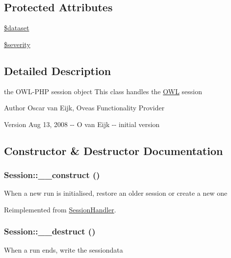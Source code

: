 \subsection*{Protected Attributes}
\begin{DoxyCompactItemize}
\item 
\hyperlink{classSessionHandler_a74c46fcfbadd4c4e6bacc73ddf350056}{\$dataset}
\item 
\hyperlink{class__OWL_ad26b40a9dbbacb33e299b17826f8327c}{\$severity}
\end{DoxyCompactItemize}


\subsection{Detailed Description}
the OWL-\/PHP session object This class handles the \hyperlink{classOWL}{OWL} session \begin{DoxyAuthor}{Author}
Oscar van Eijk, Oveas Functionality Provider 
\end{DoxyAuthor}
\begin{DoxyVersion}{Version}
Aug 13, 2008 -\/-\/ O van Eijk -\/-\/ initial version 
\end{DoxyVersion}


\subsection{Constructor \& Destructor Documentation}
\subsubsection[{\_\-\_\-construct}]{\setlength{\rightskip}{0pt plus 5cm}Session::\_\-\_\-construct ()}\label{classSession_a36373ba15d6c8f932aeea02d7320d7c8}
When a new run is initialised, restore an older session or create a new one 

Reimplemented from \hyperlink{classSessionHandler_a546ba6d31a1ce532de13f65aadc3be0e}{SessionHandler}.

\subsubsection[{\_\-\_\-destruct}]{\setlength{\rightskip}{0pt plus 5cm}Session::\_\-\_\-destruct ()}\label{classSession_aa498272c85524e4700abc3363883165b}
When a run ends, write the sessiondata 

